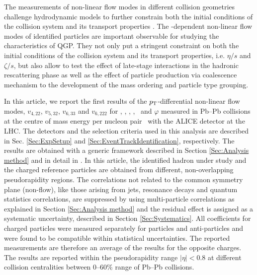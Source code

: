 The measurements of non-linear flow modes in different collision geometries challenge hydrodynamic models to further constrain both the initial conditions of the collision system and its transport properties \cite{Acharya:2017zfg}. The \pT-dependent non-linear flow modes of identified particles are important observable for studying the characteristics of QGP. They not only put a stringent constraint on both the initial conditions of the collision system and its transport properties, i.e. $\eta/s$ and $\zeta/s$, but also allow to test the effect of late-stage interactions in the hadronic rescattering phase as well as the effect of particle production via coalescence mechanism to the development of the mass ordering and particle type grouping.

In this article, we report the first results of the $p_{\rm{T}}$-differential non-linear flow modes, $v_{4,22}$, $v_{5,32}$, $v_{6,33}$ and $v_{6,222}$ for \pion, \kaon, \proton, \Ks, \lambdas~and $\varphi$ measured in Pb--Pb collisions at the centre of mass energy per nucleon pair \sNN~with the ALICE detector \cite{Aamodt:2008zz} at the LHC. The detectors and the selection criteria used in  this analysis are described in Sec. \ref{Sec:ExpSetup} and \ref{Sec:EventTrackIdentification}, respectively. %
The results are obtained with a generic framework described in Section \ref{Sec:Analysis method} and in detail in \cite{Bilandzic:2013kga}. In this article, the identified hadron under study and the charged reference particles are obtained from different, non-overlapping pseudorapidity regions. The correlations not related to the common symmetry plane (non-flow), like those arising from jets, resonance decays and quantum statistics correlations, are suppressed by using multi-particle correlations as explained in Section \ref{Sec:Analysis method} and the residual effect is assigned as a systematic uncertainty, described in Section \ref{Sec:Systematics}. All coefficients for charged particles were measured separately for particles and anti-particles and were found to be compatible within statistical uncertainties. The reported measurements are therefore an average of the results for the opposite charges. The results are reported within the pseudorapidity range $|\eta|<0.8$ at different collision centralities between 0--60\% range of Pb--Pb collisions. 





